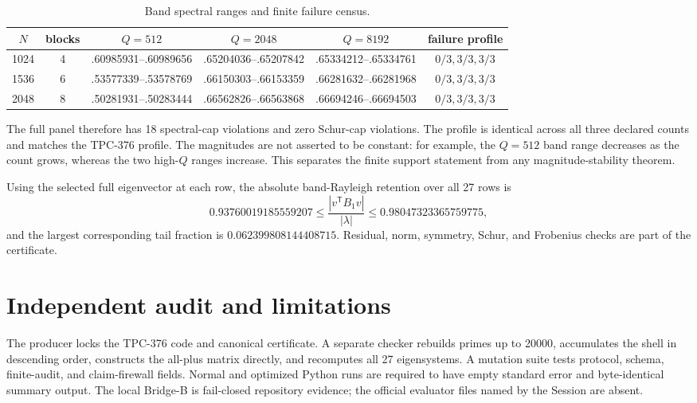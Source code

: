 \documentclass[10pt]{article}
\begin{document}
\begin{table}[ht]
\centering
\caption{Band spectral ranges and finite failure census.}
\label{tab:profile}
\scriptsize
\begin{tabular}{c c c c c c}
\toprule
$N$ & blocks & $Q=512$ & $Q=2048$ & $Q=8192$ &
failure profile\\
\midrule
1024 & 4 & .60985931--.60989656 & .65204036--.65207842 &
 .65334212--.65334761 & $0/3,3/3,3/3$\\
1536 & 6 & .53577339--.53578769 & .66150303--.66153359 &
 .66281632--.66281968 & $0/3,3/3,3/3$\\
2048 & 8 & .50281931--.50283444 & .66562826--.66563868 &
 .66694246--.66694503 & $0/3,3/3,3/3$\\
\bottomrule
\end{tabular}
\end{table}

The full panel therefore has 18 spectral-cap violations and zero Schur-cap
violations. The profile is identical across all three declared counts and
matches the TPC-376 profile. The magnitudes are not asserted to be
constant: for example, the $Q=512$ band range decreases as the count grows,
whereas the two high-$Q$ ranges increase. This separates the finite
support statement from any magnitude-stability theorem.

Using the selected full eigenvector at each row, the absolute band-Rayleigh
retention over all 27 rows is
\[
 0.93760019185559207
 \le \frac{|v^\mathsf{T}B_1v|}{|\lambda|}
 \le 0.98047323365759775,
\]
and the largest corresponding tail fraction is
$0.062399808144408715$. Residual, norm, symmetry, Schur, and Frobenius
checks are part of the certificate.

\section{Independent audit and limitations}

The producer locks the TPC-376 code and canonical certificate. A separate
checker rebuilds primes up to 20000, accumulates the shell in descending
order, constructs the all-plus matrix directly, and recomputes all 27
eigensystems. A mutation suite tests protocol, schema, finite-audit, and
claim-firewall fields. Normal and optimized Python runs are required to
have empty standard error and byte-identical summary output. The local
Bridge-B is fail-closed repository evidence; the official evaluator files
named by the Session are absent.
\end{document}
